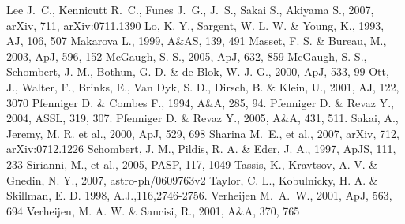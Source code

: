 \documentclass[useAMS,usenatbib]{mn2e}
\begin{document}
\begin{thebibliography}{}
Lee J.~C., Kennicutt R.~C., Funes J.~G., J.~S., Sakai S., Akiyama S., 2007, 
arXiv, 711, arXiv:0711.1390
 Lo, K. Y., Sargent, W. L. W. \& Young, K., 1993, AJ, 106, 507
 Makarova L., 1999, A\&AS, 139, 491 
 Masset, F. S. \& Bureau, M., 2003, ApJ, 596, 152
 McGaugh, S. S., 2005, ApJ, 632, 859
 McGaugh, S. S., Schombert, J. M., Bothun, G. D. \&
	de Blok, W. J. G., 2000, ApJ, 533, 99
 Ott, J., Walter, F., Brinks, E., Van Dyk, S. D.,
        Dirsch, B. \& Klein, U., 2001, AJ, 122, 3070
Pfenniger D. \& Combes F., 1994, A\&A, 285, 94.
 Pfenniger D. \& Revaz Y., 2004, ASSL, 319, 307.
 Pfenniger D. \& Revaz Y., 2005, A\&A, 431, 511.
 Sakai, A., Jeremy, M. R. et al., 2000, ApJ, 529, 698
 Sharina M.~E., et al., 2007, arXiv, 712, arXiv:0712.1226 
 Schombert, J. M., Pildis, R. A. \&
         Eder, J. A., 1997, ApJS, 111, 233
 Sirianni, M., et al., 2005, PASP, 117, 1049
 Tassis, K., Kravtsov, A. V. \& Gnedin, N. Y.,
	2007, astro-ph/0609763v2
 Taylor, C. L., Kobulnicky, H. A. \& Skillman, E. D. 1998, A.J.,116,2746-2756.
Verheijen M.~A.~W., 2001, ApJ, 563, 694 
 Verheijen, M. A. W. \& Sancisi, R., 2001, A\&A, 370, 765
\end{thebibliography}
\end{document}
